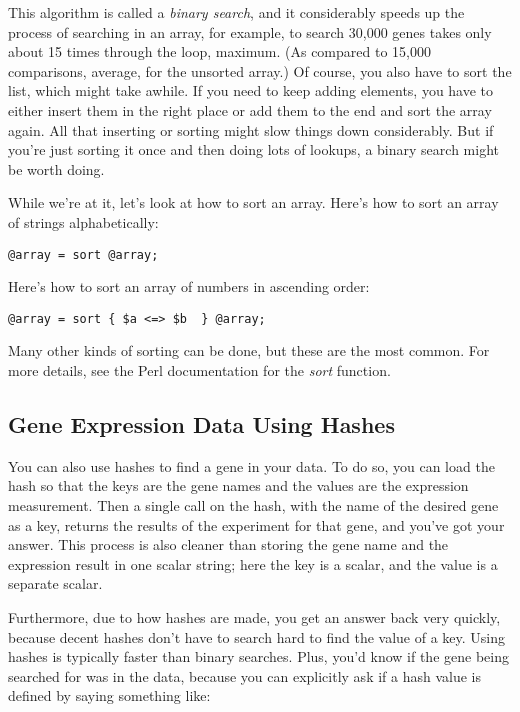 This algorithm is called a \textit{binary search}, and it considerably speeds up the process of searching in an array, for example, to search 30,000 genes takes only about 15 times through the loop, maximum. (As compared to 15,000 comparisons, average, for the unsorted array.) Of course, you also have to sort the list, which might take awhile. If you need to keep adding elements, you have to either insert them in the right place or add them to the end and sort the array again. All that inserting or sorting might slow things down considerably. But if you're just sorting it once and then doing lots of lookups, a binary search might be worth doing.

While we're at it, let's look at how to sort an array. Here's how to sort an array of strings alphabetically:

\begin{lstlisting}
@array = sort @array;
\end{lstlisting}

Here's how to sort an array of numbers in ascending order:

\begin{lstlisting}
@array = sort { $a <=> $b  } @array;
\end{lstlisting}

Many other kinds of sorting can be done, but these are the most common. For more details, see the Perl documentation for the \textit{sort} function. 

\subsection{Gene Expression Data Using Hashes}
You can also use hashes to find a gene in your data. To do so, you can load the hash so that the keys are the gene names and the values are the expression measurement. Then a single call on the hash, with the name of the desired gene as a key, returns the results of the experiment for that gene, and you've got your answer. This process is also cleaner than storing the gene name and the expression result in one scalar string; here the key is a scalar, and the value is a separate scalar.

Furthermore, due to how hashes are made, you get an answer back very quickly, because decent hashes don't have to search hard to find the value of a key. Using hashes is typically faster than binary searches.  Plus, you'd know if the gene being searched for was in the data, because you can explicitly ask if a hash value is defined by saying something like:


